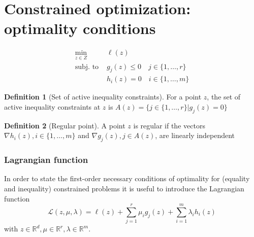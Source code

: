\documentclass[openany]{book}
\newcommand{\R}{\mathbb{R}}                %
\theoremstyle{definition}
\newtheorem{definition}{Definition}[section]
\theoremstyle{remark}
\begin{document}
\section{Constrained optimization: optimality conditions}

\begin{align*}
    \min_{z\in Z}\  &\ell(z)\\
    \text{subj. to } & g_j(z)\leq 0 \quad j\in\{1,\dots,r\}\\
    & h_i(z)=0 \quad i\in\{1,\dots,m\}
\end{align*}

\begin{definition}[Set of active inequality constraints]
    For a point $z$, the set of active inequality constraints at $z$ is $A(z) = \{j\in\{1,\dots,r\}|g_j(z)=0\}$
\end{definition}
\begin{definition}[Regular point]
    A point $z$ is regular if the vectors $\nabla h_i(z), i\in \{1,\dots,m\}$ and $\nabla g_j(z), j\in A(z)$, are linearly independent
\end{definition}

\subsubsection{Lagrangian function}

In order to state the first-order necessary conditions of optimality for (equality and inequality) constrained problems it is useful to introduce the Lagrangian function 
\[
    \mathcal{L}(z,\mu,\lambda)=\ell(z)+\displaystyle\sum_{j=1}^{r}\mu_ig_j(z) + \displaystyle\sum_{i=1}^{m}\lambda_i h_i(z)
\]
with $z \in \R^d, \mu\in\R^r,\lambda\in\R^m$.
\end{document}
